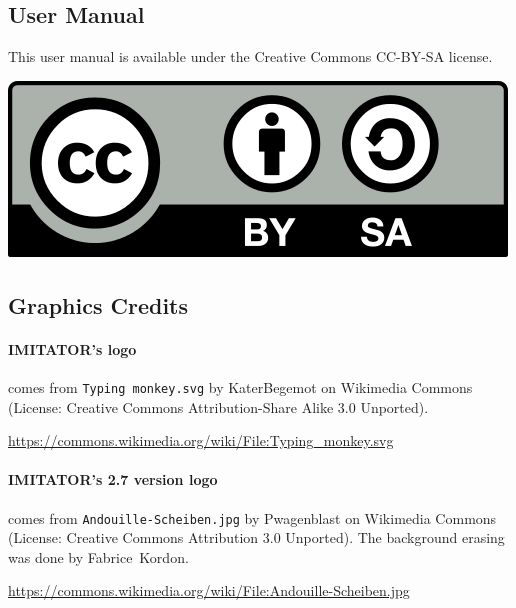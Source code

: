 \documentclass[a4paper,11pt]{report}
\newcommand{\imitator}{\textsf{IMITATOR}}
\newcommand{\stylePath}[1]{\textcolor{pathcolor}{\texttt{#1}}}
\begin{document}
\bigskip

\subsection*{User Manual}
This user manual is available under the Creative Commons CC-BY-SA license.

\begin{center}
	\includegraphics[width=.2\textwidth]{images/CC-BY-SA_500.png}
\end{center}

\bigskip

\subsection*{Graphics Credits}

\paragraph{\imitator{}'s logo} comes from \stylePath{Typing monkey.svg} by KaterBegemot on Wikimedia Commons
	(License: Creative Commons Attribution-Share Alike 3.0 Unported).

\url{https://commons.wikimedia.org/wiki/File:Typing_monkey.svg}


\paragraph{\imitator{}'s 2.7 version logo} comes from  \stylePath{Andouille-Scheiben.jpg} by Pwagenblast on Wikimedia Commons
	(License: Creative Commons Attribution 3.0 Unported).
The background erasing was done by Fabrice~Kordon.

\url{https://commons.wikimedia.org/wiki/File:Andouille-Scheiben.jpg}



\newpage


\end{document}
